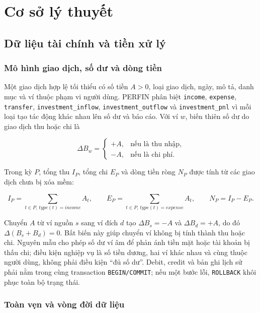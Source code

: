 \chapter{Cơ sở lý thuyết}
\label{chap:theory}

\section{Dữ liệu tài chính và tiền xử lý}

\subsection{Mô hình giao dịch, số dư và dòng tiền}

Một giao dịch hợp lệ tối thiểu có số tiền $A>0$, loại giao dịch, ngày,
mô tả, danh mục và ví thuộc phạm vi người dùng. PERFIN phân biệt
\texttt{income}, \texttt{expense}, \texttt{transfer},
\texttt{investment\_inflow}, \texttt{investment\_outflow} và
\texttt{investment\_pnl} vì mỗi loại tạo tác động khác nhau lên số dư và
báo cáo. Với ví $w$, biến thiên số dư do giao dịch thu hoặc chi là

\begin{equation}
  \Delta B_w=
  \left\{
  \begin{array}{ll}
    +A, & \mbox{nếu là thu nhập},\\
    -A, & \mbox{nếu là chi phí}.
  \end{array}
  \right.
\end{equation}

Trong kỳ $P$, tổng thu $I_P$, tổng chi $E_P$ và dòng tiền ròng $N_P$ được
tính từ các giao dịch chưa bị xóa mềm:

\begin{equation}
  I_P=\sum_{t\in P,\,type(t)=income}A_t,\qquad
  E_P=\sum_{t\in P,\,type(t)=expense}A_t,\qquad
  N_P=I_P-E_P.
\end{equation}

Chuyển $A$ từ ví nguồn $s$ sang ví đích $d$ tạo
$\Delta B_s=-A$ và $\Delta B_d=+A$, do đó
$\Delta(B_s+B_d)=0$. Bất biến này giúp chuyển ví không bị tính thành
thu hoặc chi. Nguyên mẫu cho phép số dư ví âm để phản ánh tiền mặt hoặc
tài khoản bị thấu chi; điều kiện nghiệp vụ là số tiền dương, hai ví khác
nhau và cùng thuộc người dùng, không phải điều kiện ``đủ số dư''. Debit,
credit và bản ghi lịch sử phải nằm trong cùng transaction
\texttt{BEGIN/COMMIT}; nếu một bước lỗi, \texttt{ROLLBACK} khôi phục toàn
bộ trạng thái.

\subsection{Toàn vẹn và vòng đời dữ liệu}

